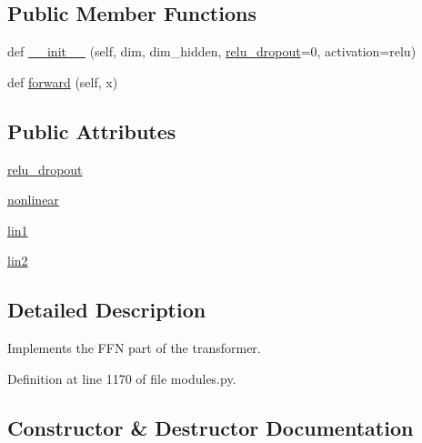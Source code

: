 \subsection*{Public Member Functions}
\begin{DoxyCompactItemize}
\item 
def \hyperlink{classparlai_1_1agents_1_1transformer_1_1modules_1_1TransformerFFN_a89cffa1831968953cdd7dfdfa7867944}{\+\_\+\+\_\+init\+\_\+\+\_\+} (self, dim, dim\+\_\+hidden, \hyperlink{classparlai_1_1agents_1_1transformer_1_1modules_1_1TransformerFFN_a22f7891e6b991a8ee6b58f08c12cf4ae}{relu\+\_\+dropout}=0, activation=\textquotesingle{}relu\textquotesingle{})
\item 
def \hyperlink{classparlai_1_1agents_1_1transformer_1_1modules_1_1TransformerFFN_a54f8d1ec7c0c4228f78a3be843ab3003}{forward} (self, x)
\end{DoxyCompactItemize}
\subsection*{Public Attributes}
\begin{DoxyCompactItemize}
\item 
\hyperlink{classparlai_1_1agents_1_1transformer_1_1modules_1_1TransformerFFN_a22f7891e6b991a8ee6b58f08c12cf4ae}{relu\+\_\+dropout}
\item 
\hyperlink{classparlai_1_1agents_1_1transformer_1_1modules_1_1TransformerFFN_a234566d2ffaffe67f04c4592cfc84265}{nonlinear}
\item 
\hyperlink{classparlai_1_1agents_1_1transformer_1_1modules_1_1TransformerFFN_addc959c81b7c0ba87a47415af7f07e16}{lin1}
\item 
\hyperlink{classparlai_1_1agents_1_1transformer_1_1modules_1_1TransformerFFN_ae0ee11939e782034e2d9809f18ed4708}{lin2}
\end{DoxyCompactItemize}


\subsection{Detailed Description}
\begin{DoxyVerb}Implements the FFN part of the transformer.
\end{DoxyVerb}
 

Definition at line 1170 of file modules.\+py.



\subsection{Constructor \& Destructor Documentation}
\mbox{\label{classparlai_1_1agents_1_1transformer_1_1modules_1_1TransformerFFN_a89cffa1831968953cdd7dfdfa7867944}} 
